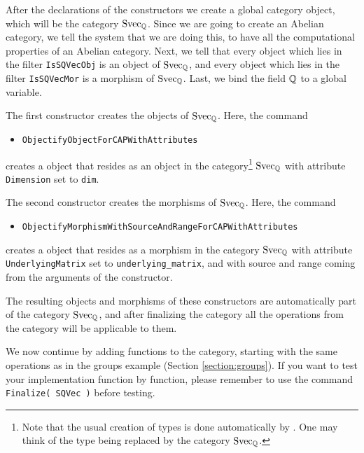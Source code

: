 After the declarations of the constructors we create a global category \GAP object, which will be the category $\mathrm{Svec}_{\mathbb{Q}}$.
Since we are going to create an Abelian category, we tell the system that we are doing this, to have all the computational
properties of an Abelian category. 
Next, we tell \CapPkg that every \GAP object which lies in the filter \texttt{IsSQVecObj} is an object of $\mathrm{Svec}_{\mathbb{Q}}$,
and every \GAP object which lies in the filter \texttt{IsSQVecMor} is a morphism of $\mathrm{Svec}_{\mathbb{Q}}$.
Last, we bind the field $\mathbb{Q}$ to a global variable.



The first constructor creates the objects of $\mathrm{Svec}_{\mathbb{Q}}$.
Here, the \CapPkg command
\begin{itemize}
  \item \texttt{ObjectifyObjectForCAPWithAttributes}
\end{itemize}
creates a \GAP object that resides as an object in the category\footnote{
  Note that the usual creation of \GAP types is done automatically by \CapPkg.
One may think of the \GAP type being replaced by the category $\mathrm{Svec}_{\mathbb{Q}}$.
}
$\mathrm{Svec}_{\mathbb{Q}}$ with attribute \texttt{Dimension} set to \texttt{dim}.

The second constructor creates the morphisms of $\mathrm{Svec}_{\mathbb{Q}}$.
Here, the \CapPkg command
\begin{itemize}
  \item \texttt{ObjectifyMorphismWithSourceAndRangeForCAPWithAttributes}
\end{itemize}
creates a \GAP object that resides as a morphism in the category
$\mathrm{Svec}_{\mathbb{Q}}$ with attribute \texttt{UnderlyingMatrix} set to \texttt{underlying\_matrix},
and with source and range coming from the arguments of the constructor.

The resulting objects and morphisms of these constructors
are automatically part of the category $\mathrm{Svec}_{\mathbb{Q}}$, and after finalizing the category all the operations from the
category will be applicable to them.

We now continue by adding functions to the category, starting with the same operations as in the groups example (Section \ref{section:groups}).
If you want to test your implementation function by function,
please remember to use the command \texttt{Finalize( SQVec )}
before testing. 



